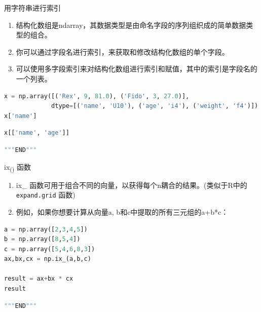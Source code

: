 \documentclass[ignorenonframetext,11pt,xcolor=dvipsnames,hyperref={colorlinks,allcolors=.,urlcolor=blue, citecolor=violet, bookmarksdepth=4},aspectratio=1610]{beamer}
\providecommand{\tightlist}{%
  \setlength{\itemsep}{0pt}\setlength{\parskip}{0pt}}
\newcommand{\passthrough}[1]{#1}
\begin{document}
\begin{frame}[fragile]{用字符串进行索引}
\protect\hypertarget{section-23}{}

\begin{enumerate}
\tightlist
\item
  结构化数组是ndarray，其数据类型是由命名字段的序列组织成的简单数据类型的组合。
\item
  你可以通过字段名进行索引，来获取和修改结构化数组的单个字段。
\item
  可以使用多字段索引来对结构化数组进行索引和赋值，其中的索引是字段名的一个列表。
\end{enumerate}

\begin{lstlisting}[language=Python]
x = np.array([('Rex', 9, 81.0), ('Fido', 3, 27.0)],
             dtype=[('name', 'U10'), ('age', 'i4'), ('weight', 'f4')])
x['name']
\end{lstlisting}

\begin{lstlisting}[language=Python]
x[['name', 'age']]
\end{lstlisting}

\begin{lstlisting}[language=Python]
"""END"""
\end{lstlisting}

\end{frame}

\begin{frame}[fragile]{ix\textsubscript{()} 函数}
\protect\hypertarget{ix-}{}

\begin{enumerate}
\tightlist
\item
  ix\_ 函数可用于组合不同的向量，以获得每个n耦合的结果。(类似于R中的
  \passthrough{\lstinline!expand.grid!} 函数)
\item
  例如，如果你想要计算从向量a, b和c中提取的所有三元组的a+b*c：
\end{enumerate}

\begin{lstlisting}[language=Python]
a = np.array([2,3,4,5])
b = np.array([8,5,4])
c = np.array([5,4,6,8,3])
ax,bx,cx = np.ix_(a,b,c)

result = ax+bx * cx
result
\end{lstlisting}

\begin{lstlisting}[language=Python]
"""END"""
\end{lstlisting}

\end{frame}
\end{document}

